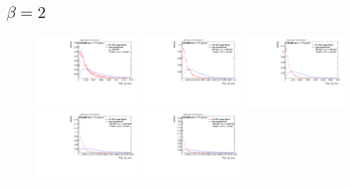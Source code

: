 \subsection*{$\beta=2$}
\begin{figure}
\includegraphics[width=0.3\textwidth]{sascha_input/Appendix/Distributions/w/distributions/beta2/h_assisted_tj_C2_2_bin1.pdf} \hspace{1mm}
\includegraphics[width=0.3\textwidth]{sascha_input/Appendix/Distributions/w/distributions/beta2/h_assisted_tj_C2_2_bin2.pdf} \hspace{1mm}
\includegraphics[width=0.3\textwidth]{sascha_input/Appendix/Distributions/w/distributions/beta2/h_assisted_tj_C2_2_bin3.pdf} 
\bigskip
\includegraphics[width=0.3\textwidth]{sascha_input/Appendix/Distributions/w/distributions/beta2/h_assisted_tj_C2_2_bin4.pdf} \hspace{1mm}
\includegraphics[width=0.3\textwidth]{sascha_input/Appendix/Distributions/w/distributions/beta2/h_assisted_tj_C2_2_bin5.pdf} \hspace{1mm}

\end{figure}
